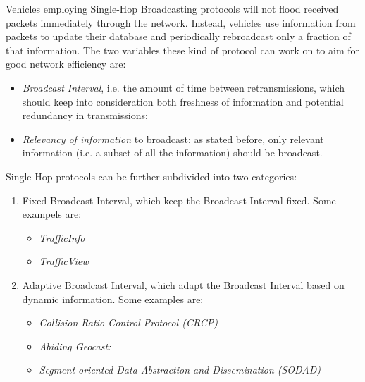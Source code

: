 \begin{enumerate}
		
		Vehicles employing Single-Hop Broadcasting protocols will not flood received packets immediately through the network. Instead, vehicles use information from packets to update their database and periodically rebroadcast only a fraction of that information. The two variables these kind of protocol can work on to aim for good network efficiency are:
		\begin{itemize}
			\item \textit{Broadcast Interval}, i.e. the amount of time between retransmissions, which should keep into consideration both freshness of information and potential redundancy in transmissions;
			\item \textit{Relevancy of information} to broadcast: as stated before, only relevant information (i.e. a subset of all the information) should be broadcast.
		\end{itemize}
		
		Single-Hop protocols can be further subdivided into two categories:
		\begin{enumerate}
			
			\item Fixed Broadcast Interval, which keep the Broadcast Interval fixed. Some exampels are:
			\begin{itemize}
				\renewcommand\labelitemi{--}
				
				\item \textit{TrafficInfo}
				
				\item \textit{TrafficView}
			\end{itemize}
			\item Adaptive Broadcast Interval, which adapt the Broadcast Interval based on dynamic information. Some examples are:
			\begin{itemize}
				\renewcommand\labelitemi{--}
				
				\item \textit{Collision Ratio Control Protocol (CRCP)}
				
				\item \textit{Abiding Geocast:}
				
				\item \textit{Segment-oriented Data Abstraction and Dissemination
					(SODAD)}
			\end{itemize}
			
		\end{enumerate}
		
		\end{enumerate}